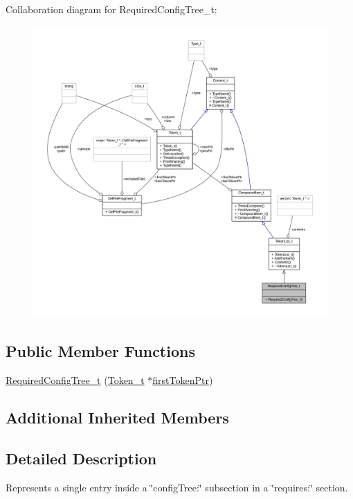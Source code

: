 Collaboration diagram for Required\+Config\+Tree\+\_\+t\+:
\nopagebreak
\begin{figure}[H]
\begin{center}
\leavevmode
\includegraphics[width=350pt]{struct_required_config_tree__t__coll__graph}
\end{center}
\end{figure}
\subsection*{Public Member Functions}
\begin{DoxyCompactItemize}
\item 
\hyperlink{struct_required_config_tree__t_a4661ad322ddb452a7a3789f35b36871f}{Required\+Config\+Tree\+\_\+t} (\hyperlink{struct_token__t}{Token\+\_\+t} $\ast$\hyperlink{struct_compound_item__t_a4d95dc788120f627e332491589d20c5c}{first\+Token\+Ptr})
\end{DoxyCompactItemize}
\subsection*{Additional Inherited Members}


\subsection{Detailed Description}
Represents a single entry inside a \char`\"{}config\+Tree\+:\char`\"{} subsection in a \char`\"{}requires\+:\char`\"{} section. 

